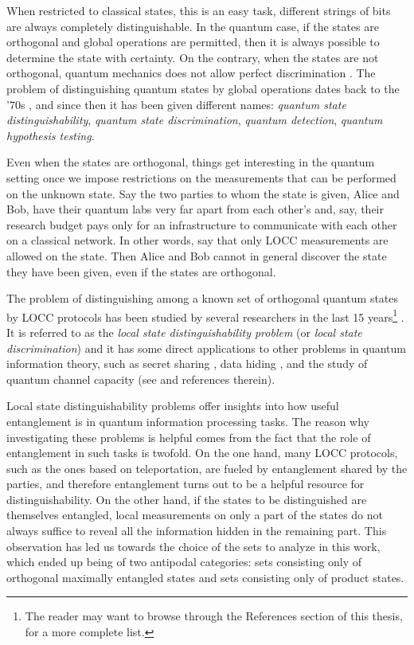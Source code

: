 When restricted to classical states, this is an easy task, 
different strings of bits are always completely distinguishable. 
In the quantum case, if the states are orthogonal and global operations 
are permitted, then it is always possible to determine the state
with certainty.
On the contrary, when the states are not orthogonal, quantum mechanics does not allow 
perfect discrimination \cite{Nielsen11}.
The problem of distinguishing quantum states by global operations 
dates back to the '70s \cite{Helstrom1969},
and since then it has been given different names: \emph{quantum state distinguishability}, 
\emph{quantum state discrimination}, \emph{quantum detection}, 
\emph{quantum hypothesis testing}.


Even when the states are orthogonal, things get interesting in the quantum setting 
once we impose 
restrictions on the measurements that can be performed on the unknown state.
Say the two parties to whom the state is given, Alice and Bob,
have their quantum labs very far apart from each other's and, say, their research budget 
pays only for an infrastructure to communicate with each other on a classical network.
In other words, say that only LOCC measurements are allowed on the state. 
Then Alice and Bob cannot in general discover the state they have been given, 
even if the states are orthogonal.

The problem of distinguishing among a known set 
of orthogonal quantum states by LOCC protocols has been studied by several researchers in the last 15 years\footnote{The reader may want to browse through the References section of this thesis, for a more complete list.}
\cite{Bennett99,Walgate00,Ghosh01,Horodecki03,Fan04,Ghosh04,Nathanson05,Watrous05,Yu11,Yu12}.
It is referred to as the \emph{local state distinguishability problem} (or 
\emph{local state discrimination}) and it has some direct applications 
to other problems in quantum information theory, 
such as secret sharing \cite{Cleve99,Gottesman00}, 
data hiding \cite{Terhal01a,DiVincenzo2002}, and the study of quantum channel 
capacity (see \cite{Watrous05,Yu11} and references therein).

Local state distinguishability problems offer insights into how useful entanglement 
is in quantum information processing tasks.
The reason why investigating these problems is helpful comes from the fact that the role of entanglement 
in such tasks is twofold. On the one hand, many LOCC protocols, such as the ones based on teleportation, 
are fueled by entanglement shared by the parties, and therefore entanglement turns 
out to be a helpful resource for distinguishability. 
On the other hand, if the states to be distinguished are themselves entangled,
local measurements on only a part of the states do not always suffice to reveal 
all the information hidden in the remaining part.
This observation has led us towards the choice of the sets to analyze in this work, 
which ended up being of two antipodal categories: sets consisting only of orthogonal maximally entangled states
and sets consisting only of product states.

